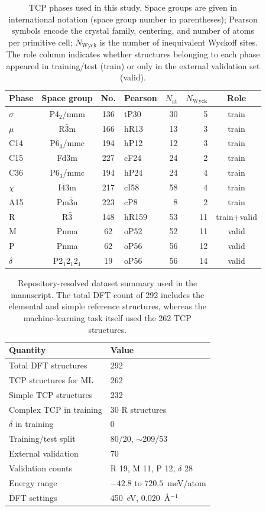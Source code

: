 \documentclass[prb,twocolumn,floatfix]{revtex4-2}
\begin{document}
\begin{table}[t]
\caption{TCP phases used in this study. Space groups are given in international notation (space group number in parentheses); Pearson symbols encode the crystal family, centering, and number of atoms per primitive cell; $N_{\mathrm{Wyck}}$ is the number of inequivalent Wyckoff sites. The role column indicates whether structures belonging to each phase appeared in training/test (train) or only in the external validation set (valid).}
\label{tab:phases}
\begin{tabular}{lcclrrc}
\toprule
Phase & Space group & No. & Pearson & $N_{\mathrm{at}}$ & $N_{\mathrm{Wyck}}$ & Role \\
\midrule
$\sigma$  & P4$_2$/mnm & 136 & tP30  & 30 & 5  & train \\
$\mu$     & R$\bar{3}$m & 166 & hR13  & 13 & 3  & train \\
C14       & P6$_3$/mmc & 194 & hP12  & 12 & 3  & train \\
C15       & Fd$\bar{3}$m & 227 & cF24 & 24 & 2  & train \\
C36       & P6$_3$/mmc & 194 & hP24  & 24 & 4  & train \\
$\chi$    & I$\bar{4}$3m & 217 & cI58  & 58 & 4  & train \\
A15       & Pm$\bar{3}$n & 223 & cP8   & 8  & 2  & train \\
R         & R$\bar{3}$  & 148 & hR159 & 53 & 11 & train+valid \\
M         & Pnma        & 62  & oP52  & 52 & 11 & valid \\
P         & Pnma        & 62  & oP56  & 56 & 12 & valid \\
$\delta$  & P2$_1$2$_1$2$_1$ & 19 & oP56 & 56 & 14 & valid \\
\bottomrule
\end{tabular}
\end{table}

\begin{table}[t]
\caption{Repository-resolved dataset summary used in the manuscript. The total DFT count of 292 includes the elemental and simple reference structures, whereas the machine-learning task itself used the 262 TCP structures.}
\label{tab:dataset}
\begin{tabular}{ll}
\toprule
Quantity & Value \\
\midrule
Total DFT structures & 292 \\
TCP structures for ML & 262 \\
Simple TCP structures & 232 \\
Complex TCP in training & 30 R structures \\
$\delta$ in training & 0 \\
Training/test split & 80/20, $\sim$209/53 \\
External validation & 70 \\
Validation counts & R 19, M 11, P 12, $\delta$ 28 \\
Energy range & $-42.8$ to $720.5$~meV/atom \\
DFT settings & 450~eV, 0.020~\AA$^{-1}$ \\
\bottomrule
\end{tabular}
\end{table}
\end{document}
